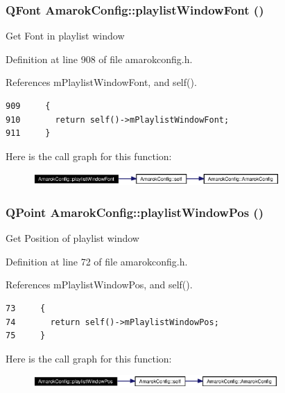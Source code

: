 \subsubsection{\setlength{\rightskip}{0pt plus 5cm}QFont Amarok\-Config::playlist\-Window\-Font ()\hspace{0.3cm}{\tt  [inline, static]}}\label{classAmarokConfig_AmarokConfige94}


Get Font in playlist window 

Definition at line 908 of file amarokconfig.h.

References m\-Playlist\-Window\-Font, and self().



\footnotesize\begin{verbatim}909     {
910       return self()->mPlaylistWindowFont;
911     }
\end{verbatim}\normalsize 


Here is the call graph for this function:\begin{figure}[H]
\begin{center}
\leavevmode
\includegraphics[width=266pt]{classAmarokConfig_AmarokConfige94_cgraph}
\end{center}
\end{figure}
\subsubsection{\setlength{\rightskip}{0pt plus 5cm}QPoint Amarok\-Config::playlist\-Window\-Pos ()\hspace{0.3cm}{\tt  [inline, static]}}\label{classAmarokConfig_AmarokConfige6}


Get Position of playlist window 

Definition at line 72 of file amarokconfig.h.

References m\-Playlist\-Window\-Pos, and self().



\footnotesize\begin{verbatim}73     {
74       return self()->mPlaylistWindowPos;
75     }
\end{verbatim}\normalsize 


Here is the call graph for this function:\begin{figure}[H]
\begin{center}
\leavevmode
\includegraphics[width=265pt]{classAmarokConfig_AmarokConfige6_cgraph}
\end{center}
\end{figure}
